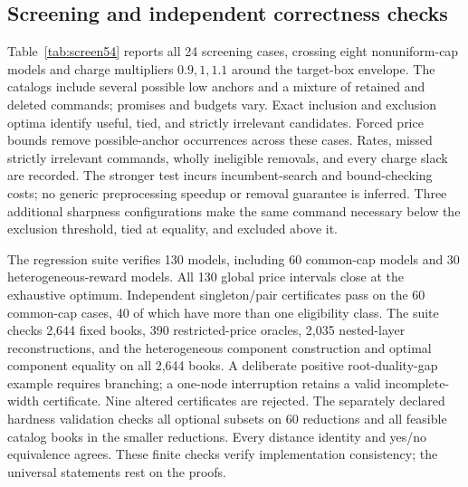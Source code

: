 \subsection{Screening and independent correctness checks}
Table~\ref{tab:screen54} reports all 24 screening cases, crossing eight nonuniform-cap models and charge multipliers $0.9,1,1.1$ around the target-box envelope. The catalogs include several possible low anchors and a mixture of retained and deleted commands; promises and budgets vary. Exact inclusion and exclusion optima identify useful, tied, and strictly irrelevant candidates. Forced price bounds remove \ForcedAnchors{} possible-anchor occurrences across these cases. Rates, missed strictly irrelevant commands, wholly ineligible removals, and every charge slack are recorded. The stronger test incurs incumbent-search and bound-checking costs; no generic preprocessing speedup or removal guarantee is inferred. Three additional sharpness configurations make the same command necessary below the exclusion threshold, tied at equality, and excluded above it.

The regression suite verifies 130 models, including 60 common-cap models and 30 heterogeneous-reward models. All 130 global price intervals close at the exhaustive optimum. Independent singleton/pair certificates pass on the 60 common-cap cases, 40 of which have more than one eligibility class. The suite checks 2,644 fixed books, 390 restricted-price oracles, 2,035 nested-layer reconstructions, and the heterogeneous component construction and optimal component equality on all 2,644 books. A deliberate positive root-duality-gap example requires branching; a one-node interruption retains a valid incomplete-width certificate. Nine altered certificates are rejected. The separately declared hardness validation checks all \HardnessSubsets{} optional subsets on 60 reductions and all \HardnessBooks{} feasible catalog books in the smaller reductions. Every distance identity and yes/no equivalence agrees. These finite checks verify implementation consistency; the universal statements rest on the proofs.
